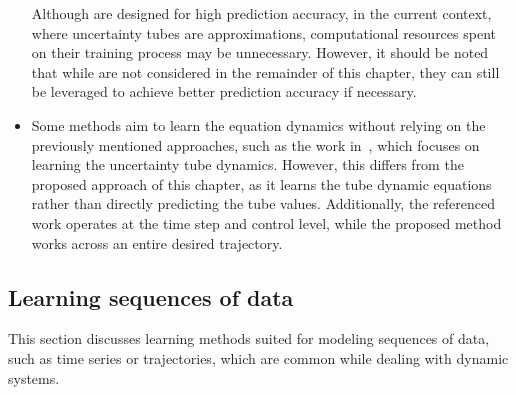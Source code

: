 \begin{itemize}
    Although  are designed for high prediction accuracy, in the current context, where uncertainty tubes are approximations, computational resources spent on their training process may be unnecessary.
    However, it should be noted that while  are not considered in the remainder of this chapter, they can still be leveraged to achieve better prediction accuracy if necessary.
    \item Some methods aim to learn the equation dynamics without relying on the previously mentioned approaches, such as the work in~\cite{cTubeMPCLearning}, which focuses on learning the uncertainty tube dynamics.
    However, this differs from the proposed approach of this chapter, as it learns the tube dynamic equations rather than directly predicting the tube values. 
    Additionally, the referenced work operates at the time step and control level, while the proposed method works across an entire desired trajectory.
\end{itemize}

\subsection{Learning sequences of data}

This section discusses learning methods suited for modeling sequences of data, such as time series or trajectories, which are common while dealing with dynamic systems.

